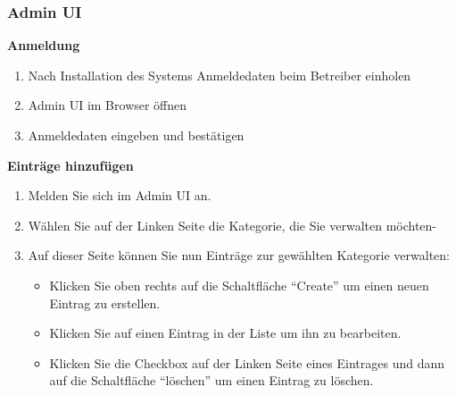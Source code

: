 \subsubsection*{Admin UI}

\textbf{Anmeldung}

\begin{enumerate}
    \item Nach Installation des Systems Anmeldedaten beim Betreiber einholen
    \item Admin UI im Browser öffnen
    \item Anmeldedaten eingeben und bestätigen
\end{enumerate}

\textbf{Einträge hinzufügen}
\begin{enumerate}
    \item Melden Sie sich im Admin UI an.
    \item Wählen Sie auf der Linken Seite die Kategorie, die Sie verwalten möchten-
    \item Auf dieser Seite können Sie nun Einträge zur gewählten Kategorie verwalten:
    \begin{itemize}
        \item Klicken Sie oben rechts auf die Schaltfläche ``Create'' um einen neuen Eintrag zu erstellen.
        \item Klicken Sie auf einen Eintrag in der Liste um ihn zu bearbeiten.
        \item Klicken Sie die Checkbox auf der Linken Seite eines Eintrages und dann auf die Schaltfläche ``löschen'' um einen Eintrag zu löschen.
    \end{itemize}
\end{enumerate}

